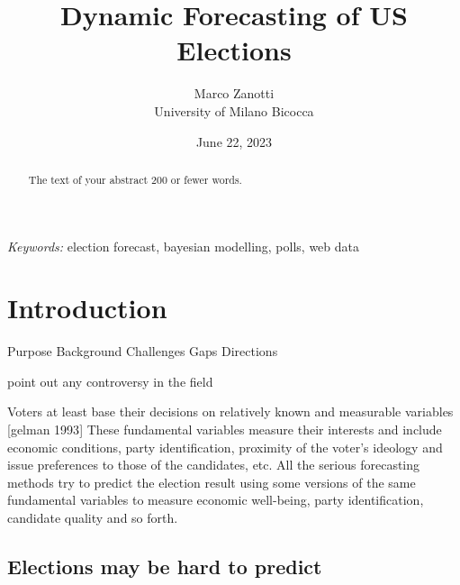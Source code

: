 \documentclass[
  12pt]{article}
\begin{document}
\def\spacingset#1{\renewcommand{\baselinestretch}%
{#1}\small\normalsize} \spacingset{1}



\date{June 22, 2023}
\title{\bf Dynamic Forecasting of US Elections}
\author{
Marco Zanotti\\
University of Milano Bicocca\\
}
\maketitle

\bigskip
\bigskip
\begin{abstract}
The text of your abstract 200 or fewer words.
\end{abstract}

\noindent%
{\it Keywords:} election forecast, bayesian modelling, polls, web data
\vfill

\newpage
\spacingset{1.9} %
\ifdefined\Shaded\renewenvironment{Shaded}{\begin{tcolorbox}[interior hidden, boxrule=0pt, borderline west={3pt}{0pt}{shadecolor}, sharp corners, frame hidden, enhanced, breakable]}{\end{tcolorbox}}\fi

\hypertarget{sec-intro}{%
\section{Introduction}\label{sec-intro}}

Purpose Background Challenges Gaps Directions

point out any controversy in the field

Voters at least base their decisions on relatively known and measurable
variables {[}gelman 1993{]} These fundamental variables measure their
interests and include economic conditions, party identification,
proximity of the voter's ideology and issue preferences to those of the
candidates, etc. All the serious forecasting methods try to predict the
election result using some versions of the same fundamental variables to
measure economic well-being, party identification, candidate quality and
so forth.

\hypertarget{elections-may-be-hard-to-predict}{%
\subsection{Elections may be hard to
predict}\label{elections-may-be-hard-to-predict}}
\end{document}
